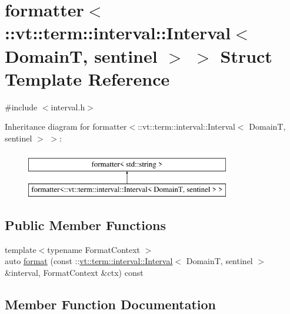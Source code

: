 \hypertarget{structformatter_3_1_1vt_1_1term_1_1interval_1_1_interval_3_01_domain_t_00_01sentinel_01_4_01_4}{}\section{formatter$<$\+:\+:vt\+:\+:term\+:\+:interval\+:\+:Interval$<$ DomainT, sentinel $>$ $>$ Struct Template Reference}
\label{structformatter_3_1_1vt_1_1term_1_1interval_1_1_interval_3_01_domain_t_00_01sentinel_01_4_01_4}


{\ttfamily \#include $<$interval.\+h$>$}

Inheritance diagram for formatter$<$\+:\+:vt\+:\+:term\+:\+:interval\+:\+:Interval$<$ DomainT, sentinel $>$ $>$\+:\begin{figure}[H]
\begin{center}
\leavevmode
\includegraphics[height=2.000000cm]{structformatter_3_1_1vt_1_1term_1_1interval_1_1_interval_3_01_domain_t_00_01sentinel_01_4_01_4}
\end{center}
\end{figure}
\subsection*{Public Member Functions}
\begin{DoxyCompactItemize}
\item 
{\footnotesize template$<$typename Format\+Context $>$ }\\auto \hyperlink{structformatter_3_1_1vt_1_1term_1_1interval_1_1_interval_3_01_domain_t_00_01sentinel_01_4_01_4_a8179eba49e70e42452b06d9dceba49d6}{format} (const \+::\hyperlink{structvt_1_1term_1_1interval_1_1_interval}{vt\+::term\+::interval\+::\+Interval}$<$ DomainT, sentinel $>$ \&interval, Format\+Context \&ctx) const
\end{DoxyCompactItemize}


\subsection{Member Function Documentation}
\mbox{\label{structformatter_3_1_1vt_1_1term_1_1interval_1_1_interval_3_01_domain_t_00_01sentinel_01_4_01_4_a8179eba49e70e42452b06d9dceba49d6}} 
